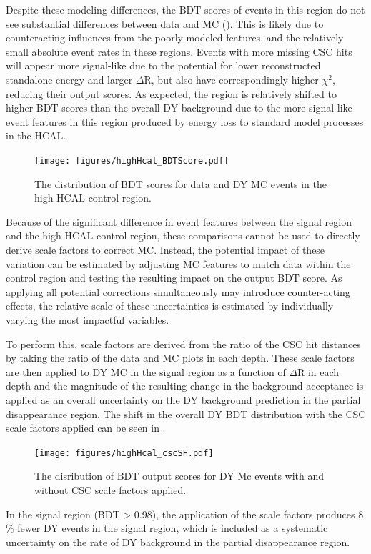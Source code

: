 Despite these modeling differences, the BDT scores of events in this region do not see substantial differences between data and MC ().
This is likely due to counteracting influences from the poorly modeled features, and the relatively small absolute event rates in these regions. 
Events with more missing CSC hits will appear more signal-like due to the potential for lower reconstructed standalone energy and larger $\Delta$R, but also have correspondingly higher $\chi^{2}$, reducing their output scores.
As expected, the region is relatively shifted to higher BDT scores than the overall DY background due to the more signal-like event features in this region produced by energy loss to standard model processes in the HCAL. 

\begin{figure}[htbp]
	\label{fig:BDTscorevalid}
	\centering
	\texttt{[image: figures/highHcal\_BDTScore.pdf]}
        \caption[BDT Validation in the High HCAL Energy Control Region]{The distribution of BDT scores for data and DY MC events in the high HCAL control region.}
\end{figure}

Because of the significant difference in event features between the signal region and the high-HCAL control region, these comparisons cannot be used to directly derive scale factors to correct MC. 
Instead, the potential impact of these variation can be estimated by adjusting MC features to match data within the control region and testing the resulting impact on the output BDT score.
As applying all potential corrections simultaneously may introduce counter-acting effects, the relative scale of these uncertainties is estimated by individually varying the most impactful variables.

To perform this, scale factors are derived from the ratio of the CSC hit distances by taking the ratio of the data and MC plots in each depth. 
These scale factors are then applied to DY MC in the signal region as a function of $\Delta$R in each depth and the magnitude of the resulting change in the background acceptance is applied as an overall uncertainty on the DY background prediction in the partial disappearance region. 
The shift in the overall DY BDT distribution with the CSC scale factors applied can be seen in .

\begin{figure}[htbp]
	\label{fig:BDTsfvalid}
	\centering
	\texttt{[image: figures/highHcal\_cscSF.pdf]}
        \caption[BDT Score Variance with Applied CSC Scale Factors]{The disribution of BDT output scores for DY Mc events with and without CSC scale factors applied.}
\end{figure}

In the signal region (BDT > 0.98), the application of the scale factors produces 8$\%$ fewer DY events in the signal region, which is included as a systematic
uncertainty on the rate of DY background in the partial disappearance region. 


